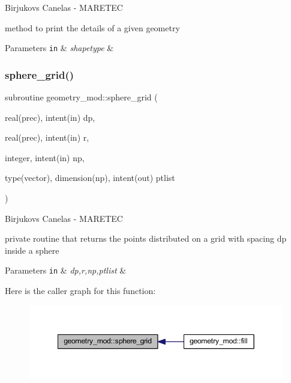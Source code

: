Birjukovs Canelas -\/ M\+A\+R\+E\+T\+EC 

method to print the details of a given geometry 
\begin{DoxyParams}[1]{Parameters}
\mbox{\tt in}  & {\em shapetype} & \\
\hline
\end{DoxyParams}
\mbox{\label{namespacegeometry__mod_a6c03a4ea3de6763940396dbeb3908ebc}} 
\subsubsection{\texorpdfstring{sphere\+\_\+grid()}{sphere\_grid()}}
{\footnotesize\ttfamily subroutine geometry\+\_\+mod\+::sphere\+\_\+grid (\begin{DoxyParamCaption}\item[{real(prec), intent(in)}]{dp,  }\item[{real(prec), intent(in)}]{r,  }\item[{integer, intent(in)}]{np,  }\item[{type(vector), dimension(np), intent(out)}]{ptlist }\end{DoxyParamCaption})\hspace{0.3cm}{\ttfamily [private]}}



Birjukovs Canelas -\/ M\+A\+R\+E\+T\+EC 

private routine that returns the points distributed on a grid with spacing dp inside a sphere 
\begin{DoxyParams}[1]{Parameters}
\mbox{\tt in}  & {\em dp,r,np,ptlist} & \\
\hline
\end{DoxyParams}
Here is the caller graph for this function\+:
\nopagebreak
\begin{figure}[H]
\begin{center}
\leavevmode
\includegraphics[width=349pt]{namespacegeometry__mod_a6c03a4ea3de6763940396dbeb3908ebc_icgraph}
\end{center}
\end{figure}
\mbox{\label{namespacegeometry__mod_a05de7940b4e7df5a2b31f3d0414e3743}} 
